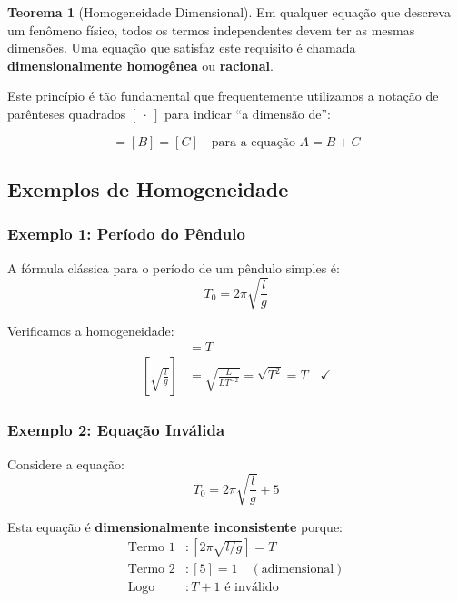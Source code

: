 \documentclass[12pt,a4paper,oneside]{book}
\theoremstyle{definition}
\newtheorem{theorem}[definition]{Teorema}
\begin{document}
\begin{theorem}[Homogeneidade Dimensional]
Em qualquer equação que descreva um fenômeno físico, todos os termos independentes devem ter as mesmas dimensões. Uma equação que satisfaz este requisito é chamada \textbf{dimensionalmente homogênea} ou \textbf{racional}.
\end{theorem}

Este princípio é tão fundamental que frequentemente utilizamos a notação de parênteses quadrados $[~\cdot~]$ para indicar ``a dimensão de'':

\begin{equation}
    [A] = [B] = [C] \quad \text{para a equação } A = B + C
\end{equation}

\subsection{Exemplos de Homogeneidade}

\subsubsection{Exemplo 1: Período do Pêndulo}

A fórmula clássica para o período de um pêndulo simples é:
\begin{equation}
    T_0 = 2\pi\sqrt{\frac{l}{g}}
\end{equation}

Verificamos a homogeneidade:
\begin{align}
    [T_0] &= T \\
    \left[\sqrt{\frac{l}{g}}\right] &= \sqrt{\frac{L}{LT^{-2}}} = \sqrt{T^2} = T \quad \checkmark
\end{align}

\subsubsection{Exemplo 2: Equação Inválida}

Considere a equação:
\begin{equation}
    T_0 = 2\pi\sqrt{\frac{l}{g}} + 5
\end{equation}

Esta equação é \textbf{dimensionalmente inconsistente} porque:
\begin{align}
    \text{Termo 1} &: [2\pi\sqrt{l/g}] = T \\
    \text{Termo 2} &: [5] = 1 \quad (\text{adimensional}) \\
    \text{Logo } &: T + 1 \text{ é inválido}
\end{align}
\end{document}

